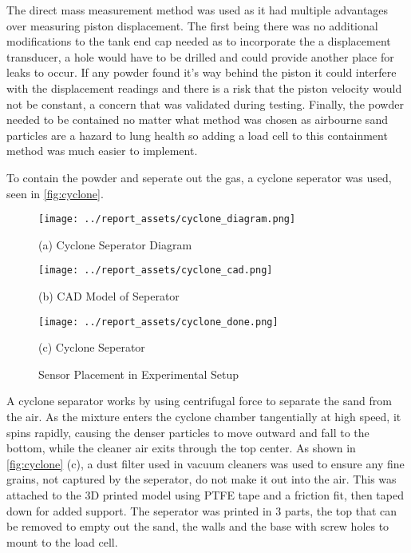 The direct mass measurement method was used as it had multiple advantages over measuring piston displacement. The first being there was no additional modifications to the tank end cap needed as to incorporate the a displacement transducer, a hole would have to be drilled and could provide another place for leaks to occur. If any powder found it's way behind the piston it could interfere with the displacement readings and there is a risk that the piston velocity would not be constant, a concern that was validated during testing. Finally, the powder needed to be contained no matter what method was chosen as airbourne sand particles are a hazard to lung health so adding a load cell to this containment method was much easier to implement.

To contain the powder and seperate out the gas, a cyclone seperator was used, seen in \autoref{fig:cyclone}.
\begin{figure}[htbp]
    \centering

    \begin{minipage}{0.3\textwidth}
        \centering
        \texttt{[image: ../report\_assets/cyclone\_diagram.png]}
        \caption*{(a) Cyclone Seperator Diagram}
    \end{minipage}
    \hfill
    \begin{minipage}{0.3\textwidth}
        \centering
        \texttt{[image: ../report\_assets/cyclone\_cad.png]}
        \caption*{(b) CAD Model of Seperator}
    \end{minipage}
    \hfill
    \begin{minipage}{0.3\textwidth}
        \centering
        \texttt{[image: ../report\_assets/cyclone\_done.png]}
        \caption*{(c) Cyclone Seperator}
    \end{minipage}
    \caption{Sensor Placement in Experimental Setup}\label{fig:cyclone}
\end{figure}
A cyclone separator works by using centrifugal force to separate the sand from the air. As the mixture enters the cyclone chamber tangentially at high speed, it spins rapidly, causing the denser particles to move outward and fall to the bottom, while the cleaner air exits through the top center. As shown in \autoref{fig:cyclone} (c), a dust filter used in vacuum cleaners was used to ensure any fine grains, not captured by the seperator, do not make it out into the air. This was attached to the 3D printed model using PTFE tape and a friction fit, then taped down for added support. The seperator was printed in 3 parts, the top that can be removed to empty out the sand, the walls and the base with screw holes to mount to the load cell.

